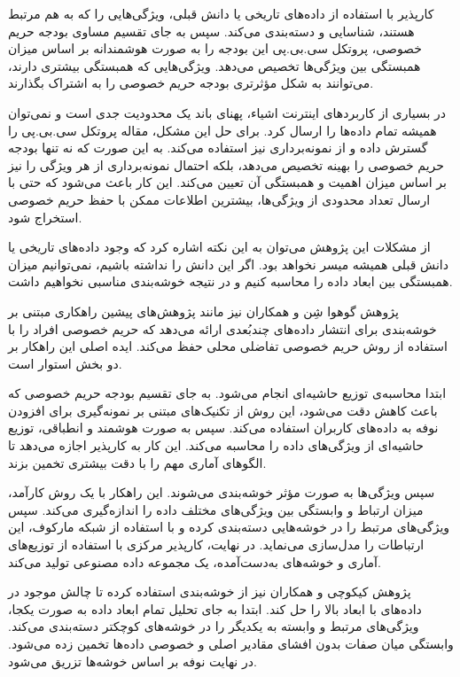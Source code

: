 
کارپذیر با استفاده از داده‌های تاریخی یا دانش قبلی، ویژگی‌هایی را که به هم مرتبط هستند، شناسایی و دسته‌بندی می‌کند. سپس به جای تقسیم مساوی بودجه حریم خصوصی، پروتکل سی.بی.پی این بودجه را به صورت هوشمندانه بر اساس میزان همبستگی بین ویژگی‌ها تخصیص می‌دهد. ویژگی‌هایی که همبستگی بیشتری دارند، می‌توانند به شکل مؤثرتری بودجه حریم خصوصی را به اشتراک بگذارند.

در بسیاری از کاربردهای اینترنت اشیاء، پهنای باند یک محدودیت جدی است و نمی‌توان همیشه تمام داده‌ها را ارسال کرد. برای حل این مشکل، مقاله پروتکل سی.بی.پی را گسترش داده و از نمونه‌برداری نیز استفاده می‌کند. به این صورت که نه تنها بودجه حریم خصوصی را بهینه تخصیص می‌دهد، بلکه احتمال نمونه‌برداری از هر ویژگی را نیز بر اساس میزان اهمیت و همبستگی آن تعیین می‌کند. این کار باعث می‌شود که حتی با ارسال تعداد محدودی از ویژگی‌ها، بیشترین اطلاعات ممکن با حفظ حریم خصوصی استخراج شود.

از مشکلات این پژوهش می‌توان به این نکته اشاره کرد که وجود داده‌های تاریخی یا دانش قبلی همیشه میسر نخواهد بود. اگر این دانش را نداشته باشیم، نمی‌توانیم میزان همبستگی بین ابعاد داده را محاسبه کنیم و در نتیجه خوشه‌بندی مناسبی نخواهیم داشت.


پژوهش گوهوا شِن و همکاران  نیز مانند پژوهش‌های پیشین راهکاری مبتنی بر خوشه‌بندی برای انتشار داده‌های چندبُعدی ارائه می‌دهد که حریم خصوصی افراد را با استفاده از روش حریم خصوصی تفاضلی محلی حفظ می‌کند. ایده اصلی این راهکار بر دو بخش استوار است.

ابتدا محاسبه‌ی توزیع حاشیه‌ای انجام می‌شود. به جای تقسیم بودجه حریم خصوصی که باعث کاهش دقت می‌شود، این روش از تکنیک‌های مبتنی بر نمونه‌گیری برای افزودن نوفه به داده‌های کاربران استفاده می‌کند. سپس به صورت هوشمند و انطباقی، توزیع حاشیه‌ای از ویژگی‌های داده را محاسبه می‌کند. این کار به کارپذیر اجازه می‌دهد تا الگوهای آماری مهم را با دقت بیشتری تخمین بزند.

سپس ویژگی‌ها به صورت مؤثر خوشه‌بندی می‌شوند. این راهکار با یک روش کارآمد، میزان ارتباط و وابستگی بین ویژگی‌های مختلف داده را اندازه‌گیری می‌کند. سپس ویژگی‌های مرتبط را در خوشه‌هایی دسته‌بندی کرده و با استفاده از شبکه مارکوف، این ارتباطات را مدل‌سازی می‌نماید. در نهایت، کارپذیر مرکزی با استفاده از توزیع‌های آماری و خوشه‌های به‌دست‌آمده، یک مجموعه داده مصنوعی تولید می‌کند. 


پژوهش کیکوچی و همکاران  نیز از خوشه‌بندی استفاده کرده تا چالش موجود در داده‌های با ابعاد بالا را حل کند. ابتدا به جای تحلیل تمام ابعاد داده به صورت یکجا، ویژگی‌های مرتبط و وابسته به یکدیگر را در خوشه‌های کوچکتر دسته‌بندی می‌کند. وابستگی میان صفات بدون افشای مقادیر اصلی و خصوصی داده‌ها تخمین زده می‌شود. در نهایت نوفه بر اساس خوشه‌ها تزریق می‌شود.

